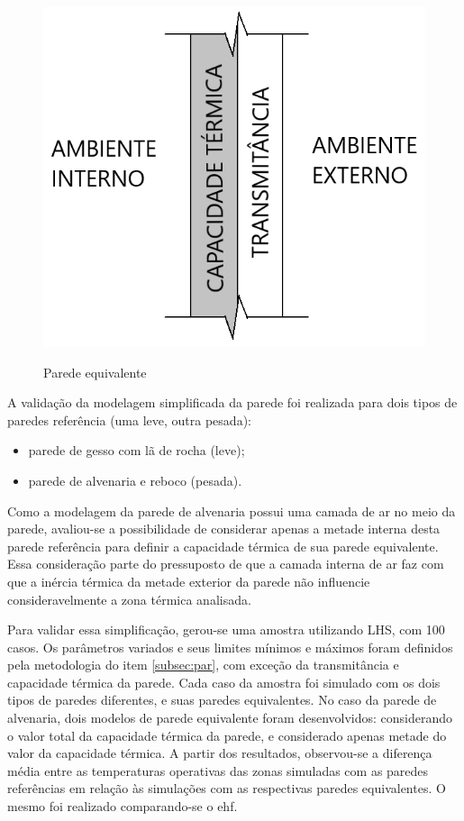 \documentclass[brazil,hardcopy,openany]{ufscthesis} %
\begin{document}
\begin{figure}[h]
	\centering
	\caption{Parede equivalente}
	\includegraphics[width=.3\linewidth]{img/parede_eq2.png}
	\label{fig:parede_eq}
\end{figure}

A validação da modelagem simplificada da parede foi realizada para dois tipos de paredes referência (uma leve, outra pesada):

\begin{itemize}
	\item parede de gesso com lã de rocha (leve);
	\item parede de alvenaria e reboco (pesada).
\end{itemize}

Como a modelagem da parede de alvenaria possui uma camada de ar no meio da parede, avaliou-se a possibilidade de considerar apenas a metade interna desta parede referência para definir a capacidade térmica de sua parede equivalente. Essa consideração parte do pressuposto de que a camada interna de ar faz com que a inércia térmica da metade exterior da parede não influencie consideravelmente a zona térmica analisada.

Para validar essa simplificação, gerou-se uma amostra utilizando LHS, com 100 casos.
Os parâmetros variados e seus limites mínimos e máximos foram definidos pela metodologia do item \ref{subsec:par}, com exceção da transmitância e capacidade térmica da parede.  %
Cada caso da amostra foi simulado com os dois tipos de paredes diferentes, e suas paredes equivalentes. No caso da parede de alvenaria, dois modelos de parede equivalente foram desenvolvidos: considerando o valor total da capacidade térmica da parede, e considerado apenas metade do valor da capacidade térmica.
A partir dos resultados, observou-se a diferença média entre as temperaturas operativas das zonas simuladas com as paredes referências em relação às simulações com as respectivas paredes equivalentes. O mesmo foi realizado comparando-se o \acrshort{ehf}.
\end{document}
